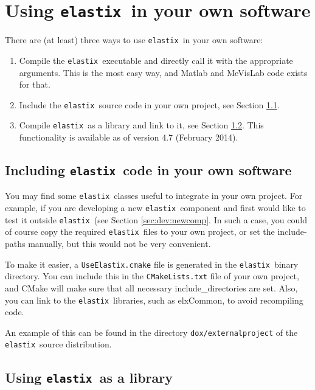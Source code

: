 \documentclass[]{report}
\newcommand{\elastix}{\texttt{elastix}}
\begin{document}
\section{Using \elastix\ in your own software}

There are (at least) three ways to use \elastix\ in your own
software:
\begin{enumerate}
\item Compile the \elastix\ executable and directly call it with the
appropriate arguments. This is the most easy way, and Matlab and
MeVisLab code exists for that.

\item Include the \elastix\ source code in your own project, see
Section \ref{ssec:dev:include}.

\item Compile \elastix\ as a library and link to it, see
Section \ref{ssec:dev:library}. This functionality is available as
of version 4.7 (February 2014).
\end{enumerate}

\subsection{Including \elastix\ code in your own software}\label{ssec:dev:include}

You may find some \elastix\ classes useful to integrate in your own
project. For example, if you are developing a new \elastix\
component and first would like to test it outside \elastix\ (see
Section \ref{sec:dev:newcomp}. In such a case, you could of course
copy the required \elastix\ files to your own project, or set the
include-paths manually, but this would not be very convenient.

To make it easier, a \texttt{UseElastix.cmake} file is generated in the
\elastix\ binary directory. You can include this in the \texttt{CMakeLists.txt}
file of your own project, and CMake will make sure that all necessary
include\_directories are set. Also, you can link to the \elastix\ libraries,
such as elxCommon, to avoid recompiling code.

An example of this can be found in the directory
\texttt{dox/externalproject} of the \elastix\ source distribution.

\subsection{Using \elastix\ as a library}\label{ssec:dev:library}
\end{document}
